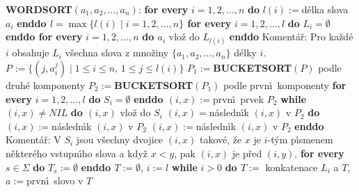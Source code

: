 \documentclass[a4paper,12pt]{article}
\begin{document}
{\bf WORDSORT$(a_1,a_2,\dots,a_n)$}:\newline 
{\bf for every} $i=1,2,\dots,n$ {\bf do} $l(i):=$d\'elka slova $a_
i$ {\bf enddo\newline 
$l=\max\{l(i)\mid i=1,2,\dots,n\}$\newline 
for every} $i=1,2,\dots,l$ {\bf do} $L_i=\emptyset$ {\bf enddo\newline 
for every} $i=1,2,\dots,n$ {\bf do\newline 
\phantom{{\rm---}}$a_i$} vlo\v z do $L_{l(i)}$\newline 
{\bf enddo\newline}
Koment\'a\v r: Pro ka\v zd\'e $i$ obsahuje $L_i$ v\v sechna slova z mno\v ziny 
$\{a_1,a_2,\dots,a_n\}$ d\'elky $i$.\newline 
$P_{}:=\{(j,a_i^j)\mid 1\le i\le n,\,1\le j\le l(i)\}$\newline 
$P_1:=${\bf BUCKETSORT$(P)$} podle druh\'e komponenty\newline 
$P_2:=${\bf BUCKETSORT$(P_1)$} podle prvn\'\i\ komponenty\newline 
{\bf for every} $i=1,2,\dots,l$ {\bf do} $S_i=\emptyset$ {\bf enddo\newline 
$(i,x):=$}prvn\'\i\ prvek $P_2$\newline 
{\bf while} $(i,x)\ne NIL$ {\bf do\newline 
\phantom{{\rm---}}$(i,x)$} vlo\v z do $S_i$\newline 
\phantom{---}{\bf while}$(i,x)=$n\'asledn\'\i k $(i,x)$ v $P_2$ {\bf do}\newline
\phantom{{\rm------}}$(i,x):=$n\'asledn\'\i k $(i,x)$ v $P_2$\newline 
{}\newline
\phantom{---}$(i,x):=$n\'asledn\'\i k $(i,x)$ v $P_2$\newline 
{\bf enddo}\newline
Koment\'a\v r: V $S_i$ jsou v\v sechny dvojice $(i,x)$ takov\'e, \v ze $
x$ 
je $i$-t\'ym p\'\i smenem n\v ekter\'eho vstupn\'\i ho slova a kdy\v z $
x<y$, pak 
$(i,x)$ je p\v red $(i,y)$.\newline 
{\bf for every} $s\in\Sigma$ {\bf do} $T_s:=\emptyset$ {\bf enddo\newline 
$T:=\emptyset$}, $i:=l$\newline 
{\bf while} $i>0$ {\bf do\newline 
\phantom{{\rm---}}$T:=$} konkatenace $L_i$ a $T$, $a:=$prvn\'\i\ slovo v $
T$\newline 
\end{document}
